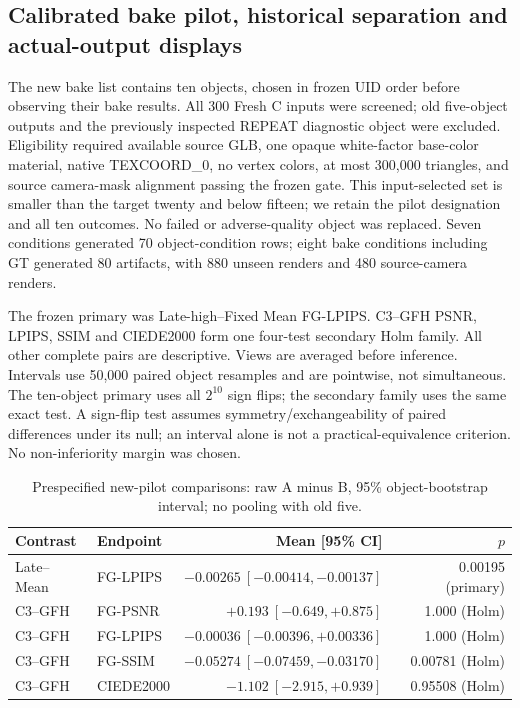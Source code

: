 \documentclass[11pt]{article}
\begin{document}
\subsection*{Calibrated bake pilot, historical separation and actual-output displays}
The new bake list contains ten objects, chosen in frozen UID order before observing their bake results. All 300 Fresh C inputs were screened; old five-object outputs and the previously inspected REPEAT diagnostic object were excluded. Eligibility required available source GLB, one opaque white-factor base-color material, native TEXCOORD\_0, no vertex colors, at most 300,000 triangles, and source camera-mask alignment passing the frozen gate. This input-selected set is smaller than the target twenty and below fifteen; we retain the pilot designation and all ten outcomes. No failed or adverse-quality object was replaced. Seven conditions generated 70 object-condition rows; eight bake conditions including GT generated 80 artifacts, with 880 unseen renders and 480 source-camera renders.

The frozen primary was Late-high--Fixed Mean FG-LPIPS. C3--GFH PSNR, LPIPS, SSIM and CIEDE2000 form one four-test secondary Holm family. All other complete pairs are descriptive. Views are averaged before inference. Intervals use 50,000 paired object resamples and are pointwise, not simultaneous. The ten-object primary uses all $2^{10}$ sign flips; the secondary family uses the same exact test. A sign-flip test assumes symmetry/exchangeability of paired differences under its null; an interval alone is not a practical-equivalence criterion. No non-inferiority margin was chosen.

\begin{table}[ht]\centering\scriptsize
\caption{Prespecified new-pilot comparisons: raw A minus B, 95\% object-bootstrap interval; no pooling with old five.}\label{tab:bake-paired}
\begin{tabular}{llrr}
\toprule Contrast & Endpoint & Mean [95\% CI] & $p$ \\
\midrule
Late--Mean & FG-LPIPS & $-0.00265\ [-0.00414,-0.00137]$ & 0.00195 (primary) \\
C3--GFH & FG-PSNR & $+0.193\ [-0.649,+0.875]$ & 1.000 (Holm) \\
C3--GFH & FG-LPIPS & $-0.00036\ [-0.00396,+0.00336]$ & 1.000 (Holm) \\
C3--GFH & FG-SSIM & $-0.05274\ [-0.07459,-0.03170]$ & 0.00781 (Holm) \\
C3--GFH & CIEDE2000 & $-1.102\ [-2.915,+0.939]$ & 0.95508 (Holm) \\
\bottomrule\end{tabular}\end{table}
\end{document}
